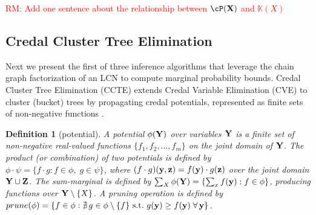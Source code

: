 \documentclass{article}
\newtheorem{definition}{Definition}
\newcommand{\kr}[1]{\mathbb{K}\!\left( #1 \right)}
\begin{document}
\textcolor{red}{RM: Add one sentence about the relationship between $\cP(\bX)$ and $\kr{X}$}


\subsection{Credal Cluster Tree Elimination}
Next we present the first of three inference algorithms that leverage the chain graph factorization of an LCN to compute marginal probability bounds. Credal Cluster Tree Elimination (CCTE) extends Credal Variable Elimination (CVE) \cite{maua2020ijar} to cluster (bucket) trees \cite{spiegelhalter88,dechter-bucket,kask05} by propagating credal potentials, represented as finite sets of non‑negative functions \cite{maua2020ijar}.


\begin{definition}[potential]
A \emph{potential} $\phi(\mathbf{Y})$ over variables $\mathbf{Y}$ is a finite set of non-negative real-valued functions $\{f_1, f_2, \dots, f_m\}$ on the joint domain of $\mathbf{Y}$. The \emph{product} (or combination) of two potentials is defined by $\phi \cdot \psi = \{f \cdot g : f \in \phi, \; g \in \psi\}$, where $(f \cdot g)(\mathbf{y}, \mathbf{z}) = f(\mathbf{y}) \cdot g(\mathbf{z})$ over the joint domain $\mathbf{Y} \cup \mathbf{Z}$. The \emph{sum-marginal} is defined by $\sum_{X} \phi(\mathbf{Y}) = \{ \sum_{x} f(\mathbf{y}) : f \in \phi \}$, producing functions over $\mathbf{Y} \setminus \{X\}$. A \emph{pruning} operation is defined by $prune(\phi) = \{f \in \phi : \nexists\, g \in \phi \setminus \{f\} \text{ s.t.\ } g(\mathbf{y}) \geq f(\mathbf{y})\; \forall\, \mathbf{y}\}$. 
\end{definition}
\end{document}
